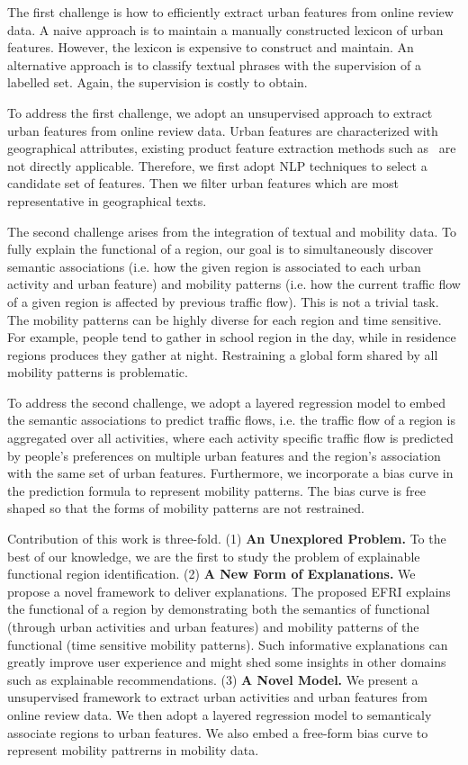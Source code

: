 \documentclass[runningheads]{llncs}
\begin{document}
The first challenge is how to efficiently extract urban features from online review data.
A naive approach is to maintain a manually constructed lexicon of urban features.
However, the lexicon is expensive to construct and maintain.
An alternative approach is to classify textual phrases with the supervision of a labelled set.
Again, the supervision is costly to obtain.

To address the first challenge, we adopt an unsupervised approach to extract urban features from online review data.
Urban features are characterized with geographical attributes, existing product feature extraction methods such as~\cite{Lu2011Label} are not directly applicable.
Therefore, we first adopt NLP techniques to select a candidate set of features.  
Then we filter urban features which are most representative in geographical texts.

The second challenge arises from the integration of textual and mobility data.
To fully explain the functional of a region, our goal is to simultaneously discover semantic associations (i.e. how the given region is associated to each urban activity and urban feature) and mobility patterns (i.e. how the current traffic flow of a given region is affected by previous traffic flow).
This is not a trivial task.
The mobility patterns can be highly diverse for each region and time sensitive.
For example, people tend to gather in school region in the day, while in residence regions produces they gather at night.
Restraining a global form shared by all mobility patterns is problematic.

To address the second challenge, we adopt a layered regression model to embed the semantic associations to predict traffic flows, i.e. the traffic flow of a region is aggregated over all activities, where each activity specific traffic flow is predicted by people's preferences on multiple urban features and the region's association with the same set of urban features.
Furthermore, we incorporate a bias curve in the prediction formula to represent mobility patterns. 
The bias curve is free shaped so that the forms of mobility patterns are not restrained.

Contribution of this work is three-fold. (1) \textbf{An Unexplored Problem.} To the best of our knowledge, we are the first to study the problem of explainable functional region identification. (2) \textbf{A New Form of Explanations.} We propose a novel framework to deliver explanations. The proposed EFRI explains the functional of a region by demonstrating both the semantics of functional (through urban activities and urban features) and mobility patterns of the functional (time sensitive mobility patterns). Such informative explanations can greatly improve user experience and might shed some insights in other domains such as explainable recommendations. (3) \textbf{A Novel Model.} We present a unsupervised framework to extract urban activities and urban features from online review data. We then adopt a layered regression model to semanticaly associate regions to urban features. We also embed a free-form bias curve to represent mobility pattrerns in mobility data.   
\end{document}
